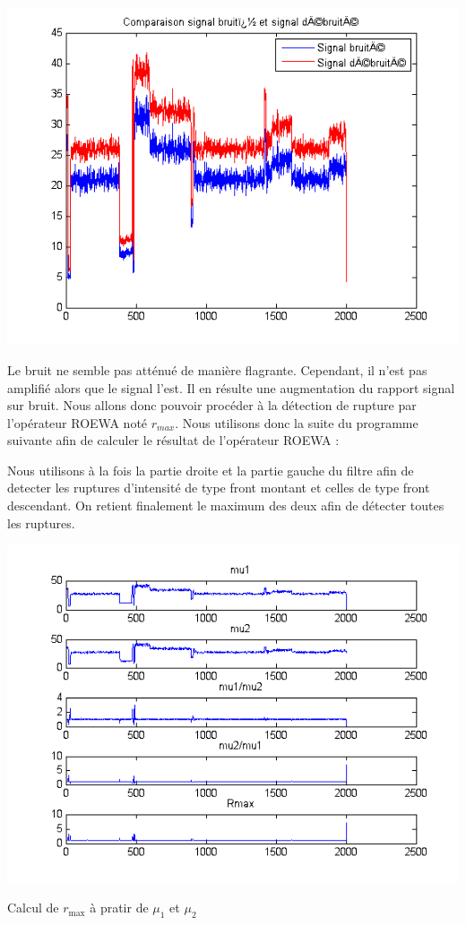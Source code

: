 \documentclass[a4paper,11pt]{article}
\newcommand{\FSource}[1]{%
  
  }
\begin{document}
\vspace{0.5cm}

\FSource{matlab/3-2.m}

\vspace{0.5cm}

\includegraphics[width=15cm]{capture3/partie3_04.png}

Le bruit ne semble pas atténué de manière flagrante. Cependant, il n'est pas
amplifié alors que le signal l'est. Il en résulte une augmentation du rapport
signal sur bruit.
Nous allons donc pouvoir procéder à la détection de rupture par l'opérateur ROEWA noté $r_{max}$. Nous utilisons donc la suite du programme suivante afin de calculer le résultat de l'opérateur ROEWA :

\vspace{0.5cm}

\FSource{matlab/3-3.m}

Nous utilisons à la fois la partie droite et la partie gauche du filtre afin de
detecter les ruptures d'intensité de type front montant et celles de type front
descendant. On retient finalement le maximum des deux afin de détecter toutes
les ruptures.

\includegraphics[width=15cm]{capture3/partie3_05.png}
\begin{center}Calcul de $r_\textrm{max}$ à pratir de $\mu_1$ et
$\mu_2$\end{center}
\end{document}
